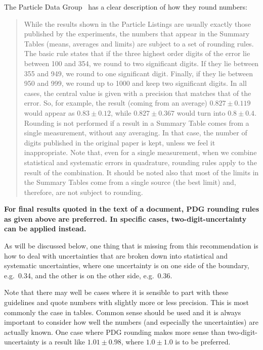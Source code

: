 \documentclass[UKenglish]{style/atlasdoc}
\begin{document}
The Particle Data Group~\cite{PDG2012} has a clear description of how
they round numbers:
\begin{quotation}
  While the results shown in the Particle Listings are usually exactly
  those published by the experiments, the numbers that appear in the
  Summary Tables (means, averages and limits) are subject to a set of
  rounding rules. The basic rule states that if the three highest
  order digits of the error lie between 100 and 354, we round to two
  significant digits. If they lie between 355 and 949, we round to one
  significant digit. Finally, if they lie between 950 and 999, we
  round up to 1000 and keep two significant digits. In all cases, the
  central value is given with a precision that matches that of the
  error. So, for example, the result (coming from an average) $0.827
  \pm 0.119$ would appear as $0.83 \pm 0.12$, while $0.827 \pm 0.367$
  would turn into $0.8 \pm 0.4$. Rounding is not performed if a result in a
  Summary Table comes from a single measurement, without any
  averaging. In that case, the number of digits published in the
  original paper is kept, unless we feel it inappropriate. Note that,
  even for a single measurement, when we combine statistical and
  systematic errors in quadrature, rounding rules apply to the result
  of the combination. It should be noted also that most of the limits
  in the Summary Tables come from a single source (the best limit)
  and, therefore, are not subject to rounding.
\end{quotation}

\textbf{For final results quoted in the text of a document, PDG
  rounding rules as given above are preferred.  In specific cases,
  two-digit-uncertainty can be applied instead.}

As will be discussed below, one thing that is missing from this
recommendation is how to deal with uncertainties that are broken down into
statistical and systematic uncertainties, where one uncertainty is on one
side of the boundary, e.g.\ \num{0.34}, and the other is on the other
side, e.g.\ \num{0.36}.

Note that there may well be cases where it is sensible to part with
these guidelines and quote numbers with slightly more or less
precision. This is most commonly the case in tables. Common
sense should be used and it is always important to consider how
well the numbers (and especially the uncertainties) are actually known.
One case where PDG rounding makes more sense than
two-digit-uncertainty is a result like $1.01 \pm 0.98$, where $1.0 \pm 1.0$
is to be preferred.
\end{document}
